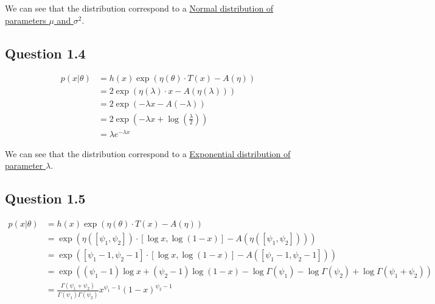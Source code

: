 \documentclass{article}
\begin{document}
We can see that the distribution correspond to a \underline{Normal distribution of parameters $\mu$ and $\sigma^2$}.

\subsection{Question 1.4}

\begin{equation}
    \begin{split}
        p(x|\theta) & = h(x) \exp(\eta(\theta) \cdot T(x) - A(\eta))                        \\
                    & = 2 \exp(\eta(\lambda) \cdot x - A(\eta(\lambda)))                    \\
                    & = 2 \exp(- \lambda x - A(-\lambda))                                   \\
                    & = 2 \exp\left(- \lambda x + \log\left(\frac{\lambda}{2}\right)\right) \\
                    & = \lambda e^{- \lambda x}
    \end{split}
\end{equation}

We can see that the distribution correspond to a \underline{Exponential distribution of parameter $\lambda$}.

\subsection{Question 1.5}

\begin{equation}
    \begin{split}
        p(x|\theta) & = h(x) \exp(\eta(\theta) \cdot T(x) - A(\eta))                                                                                     \\
                    & = \exp(\eta([\psi_1, \psi_2]) \cdot [\log x, \log (1 - x)] - A(\eta([\psi_1, \psi_2])))                                            \\
                    & = \exp([\psi_1 - 1, \psi_2 - 1] \cdot [\log x, \log (1 - x)] - A([\psi_1 - 1, \psi_2 - 1]))                                        \\
                    & = \exp((\psi_1 - 1) \log x + (\psi_2 - 1) \log (1 - x) - \log \Gamma(\psi_1) - \log \Gamma(\psi_2) + \log \Gamma(\psi_1 + \psi_2)) \\
                    & = \frac{\Gamma(\psi_1 + \psi_2)}{\Gamma(\psi_1) \Gamma(\psi_2)} x^{\psi_1 - 1} (1 - x)^{\psi_2 - 1}
    \end{split}
\end{equation}
\end{document}
